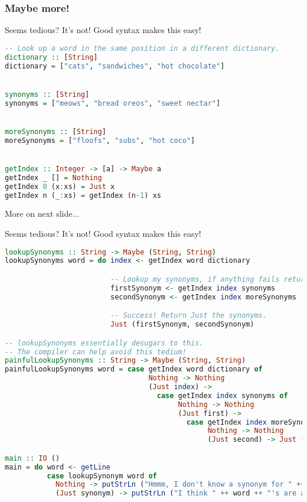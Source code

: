 \documentclass{beamer}
\begin{document}
\begin{frame}[fragile]
  \frametitle{Maybe more!}

  Seems tedious? It's not! Good syntax makes this easy!
  \begin{lstlisting}[frame=single, language=Haskell, breaklines=true, basicstyle=\ttfamily\tiny]
-- Look up a word in the same position in a different dictionary.
dictionary :: [String]
dictionary = ["cats", "sandwiches", "hot chocolate"]


synonyms :: [String]
synonyms = ["meows", "bread oreos", "sweet nectar"]


moreSynonyms :: [String]
moreSynonyms = ["floofs", "subs", "hot coco"]


getIndex :: Integer -> [a] -> Maybe a
getIndex _ [] = Nothing
getIndex 0 (x:xs) = Just x
getIndex n (_:xs) = getIndex (n-1) xs
  \end{lstlisting}

  More on next slide...

\end{frame}

\begin{frame}[fragile]
  Seems tedious? It's not! Good syntax makes this easy!

  \begin{lstlisting}[frame=single, language=Haskell, breaklines=true, basicstyle=\ttfamily\tiny]
lookupSynonyms :: String -> Maybe (String, String)
lookupSynonyms word = do index <- getIndex word dictionary

                         -- Lookup my synonyms, if anything fails return Nothing.
                         firstSynonym <- getIndex index synonyms
                         secondSynonym <- getIndex index moreSynonyms

                         -- Success! Return Just the synonyms.
                         Just (firstSynonym, secondSynonym)

-- lookupSynonyms essentially desugars to this.
-- The compiler can help avoid this tedium!
painfulLookupSynonyms :: String -> Maybe (String, String)
painfulLookupSynonyms word = case getIndex word dictionary of
                                  Nothing -> Nothing
                                  (Just index) ->
                                    case getIndex index synonyms of 
                                         Nothing -> Nothing
                                         (Just first) ->
                                           case getIndex index moreSynonyms of
                                                Nothing -> Nothing
                                                (Just second) -> Just (first, second)

main :: IO ()
main = do word <- getLine
          case lookupSynonym word of
            Nothing -> putStrLn ("Hmmm, I don't know a synonym for " ++ word)
            (Just synonym) -> putStrLn ("I think " ++ word ++ "'s are a lot like " ++ synonym ++ "'s!")
  \end{lstlisting}
\end{frame}
\end{document}

